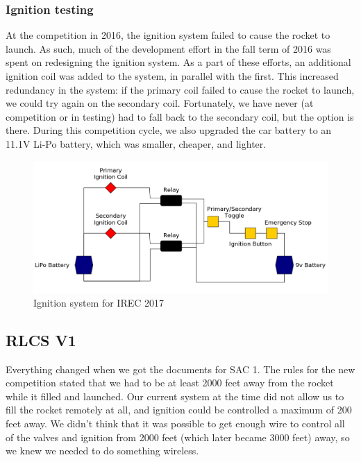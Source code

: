 \documentclass[11pt]{article}
\begin{document}
\subsubsection{Ignition testing}
\label{sec:org7495877}

At the competition in 2016, the ignition system failed to cause the rocket to
launch. As such, much of the development effort in the fall term of 2016 was
spent on redesigning the ignition system. As a part of these efforts, an
additional ignition coil was added to the system, in parallel with the
first. This increased redundancy in the system: if the primary coil failed to
cause the rocket to launch, we could try again on the secondary
coil. Fortunately, we have never (at competition or in testing) had to fall back
to the secondary coil, but the option is there. During this competition cycle,
we also upgraded the car battery to an 11.1V Li-Po battery, which was smaller,
cheaper, and lighter.

\begin{figure}[htbp]
\centering
\includegraphics[width=.9\linewidth]{./images/tsig.png}
\caption{\label{fig:org3291e70}
Ignition system for IREC 2017}
\end{figure}

\subsection{RLCS V1}
\label{sec:org9541d10}

Everything changed when we got the documents for SAC 1. The rules for the new
competition stated that we had to be at least 2000 feet away from the rocket
while it filled and launched. Our current system at the time did not allow us to
fill the rocket remotely at all, and ignition could be controlled a maximum of
200 feet away. We didn't think that it was possible to get enough wire to
control all of the valves and ignition from 2000 feet (which later became 3000
feet) away, so we knew we needed to do something wireless.
\end{document}
